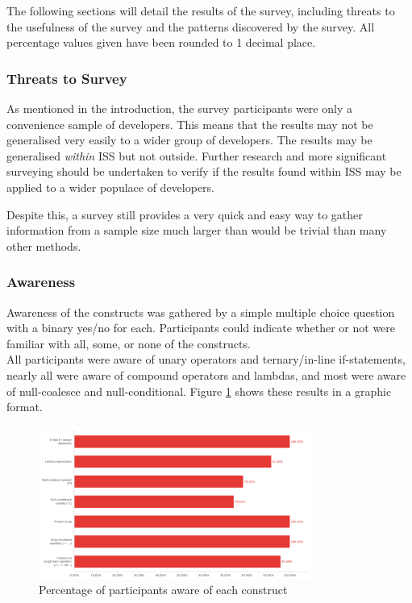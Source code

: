 \documentclass{article}
\begin{document}
        The following sections will detail the results of the survey, including threats to the usefulness of the survey and the patterns discovered by the survey. All percentage values given have been rounded to 1 decimal place.
        \subsubsection{Threats to Survey}
            As mentioned in the introduction, the survey participants were only a convenience sample of developers. This means that the results may not be generalised very easily to a wider group of developers. The results may be generalised \emph{within} ISS but not outside. Further research and more significant surveying should be undertaken to verify if the results found within ISS may be applied to a wider populace of developers.

            Despite this, a survey still provides a very quick and  easy way to gather information from a sample size much larger than would be trivial than many other methods.
        \subsubsection{Awareness}
            Awareness of the constructs was gathered by a simple multiple choice question with a binary yes/no for each. Participants could indicate whether or not were familiar with all, some, or none of the constructs.
            \\\newline
            All participants were aware of unary operators and ternary/in-line if-statements, nearly all were aware of compound operators and lambdas, and most were aware of null-coalesce and null-conditional. Figure \ref{fig:awareness} shows these results in a graphic format.

            \begin{figure}[htbp]
                \centering
                \includegraphics[width=0.8\textwidth]{awareness}
                \caption{Percentage of participants aware of each construct}
                \label{fig:awareness}
            \end{figure}
\end{document}
